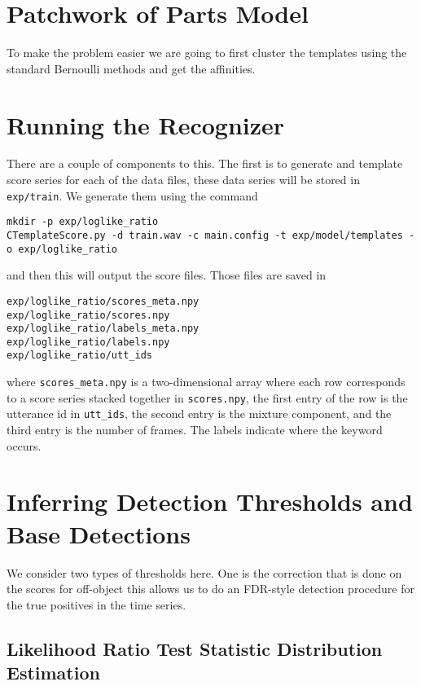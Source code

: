 \documentclass{article}
\begin{document}
\section{Patchwork of Parts Model}

To make the problem easier we are going to first cluster the templates using the standard Bernoulli methods
and get the affinities.


\section{Running the Recognizer}



There are a couple of components to this. The first is to generate and template score series for each of the data files, these data
series will be stored in \texttt{exp/train}. We generate them
using the command
\begin{verbatim}
mkdir -p exp/loglike_ratio
CTemplateScore.py -d train.wav -c main.config -t exp/model/templates -o exp/loglike_ratio
\end{verbatim}
and then this will output the score files.
Those files are saved in 
\begin{verbatim}
exp/loglike_ratio/scores_meta.npy
exp/loglike_ratio/scores.npy
exp/loglike_ratio/labels_meta.npy
exp/loglike_ratio/labels.npy
exp/loglike_ratio/utt_ids
\end{verbatim}
where \texttt{scores\_meta.npy} is a two-dimensional array
where each row corresponds to a score series
stacked together in \texttt{scores.npy}, the first entry of the row
is the utterance id in \texttt{utt\_ids}, the second entry
is the mixture component, and the third entry is the number
of frames.  The labels indicate where the keyword occurs.

\section{Inferring Detection Thresholds and Base Detections}

We consider two types of thresholds here. One is the correction
that is done on the scores for off-object this allows us to do
an FDR-style detection procedure for the true positives
in the time series.

\subsection{Likelihood Ratio Test Statistic Distribution Estimation}
\end{document}
